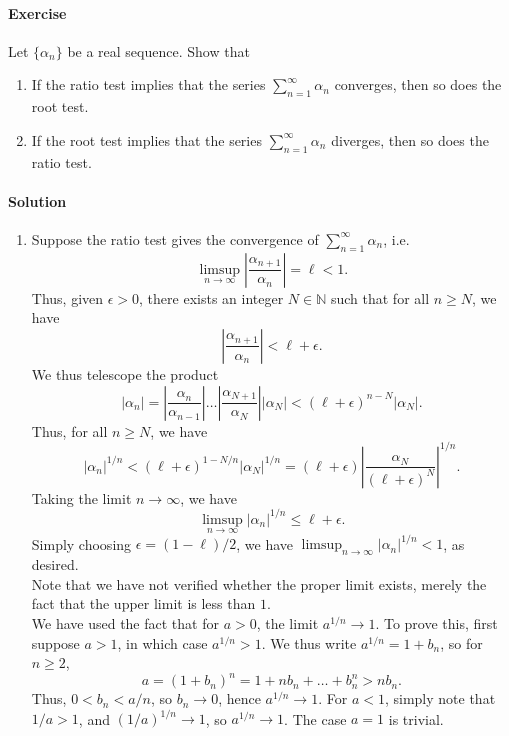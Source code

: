 \documentclass[10pt]{article}
\newcounter{prob}
\def\problem{\stepcounter{prob}\paragraph{Exercise \arabic{prob}}}
\def\solution{\paragraph{Solution}}
\begin{document}
        \problem Let $\{\alpha_n\}$ be a real sequence. Show that
        \begin{enumerate}
                \item If the ratio test implies that the series $\sum_{n = 1}^\infty \alpha_n$ converges, then so does the root test.
                \item If the root test implies that the series $\sum_{n = 1}^\infty \alpha_n$ diverges, then so does the ratio test.
        \end{enumerate}

        \solution
        \begin{enumerate}
                \item Suppose the ratio test gives the convergence of $\sum_{n = 1}^\infty \alpha_n$, i.e.\ 
                \[
                        \limsup_{n \to \infty} \left|\frac{\alpha_{n + 1}}{\alpha_n}\right| = \ell < 1.
                \]
                Thus, given $\epsilon > 0$, there exists an integer $N \in \mathbb{N}$ such that for all $n \geq N$, we have 
                \[
                        \left|\frac{\alpha_{n + 1}}{\alpha_n}\right| < \ell + \epsilon.
                \]
                We thus telescope the product
                \[
                        |\alpha_n| = \left| \frac{\alpha_{n}}{\alpha_{n - 1}} \right|\dots \left| \frac{\alpha_{N + 1}}{\alpha_{N}} \right| |\alpha_N|
                                < (\ell + \epsilon)^{n - N} |\alpha_N|.
                \]
                Thus, for all $n \geq N$, we have
                \[
                        |\alpha_n|^{1 /n} < (\ell + \epsilon)^{1 - N /n}|\alpha_N|^{1 /n}
                                = (\ell + \epsilon) \left|\frac{\alpha_N}{(\ell + \epsilon)^N}\right|^{1 /n}.
                \]
                Taking the limit $n \to \infty$, we have
                \[
                        \limsup_{n \to \infty} |\alpha_n|^{1 /n} \leq \ell + \epsilon.
                \]
                Simply choosing $\epsilon = (1 - \ell)/2$, we have $\limsup_{n \to \infty} |\alpha_n|^{1 /n} < 1$, as desired. \\

                Note that we have not verified whether the proper limit exists, merely the fact that the upper limit is less than $1$. \\

                We have used the fact that for $a > 0$, the limit $a^{1 /n} \to 1$. To prove this, first suppose $a > 1$, in which case
                $a^{1 /n} > 1$. We thus write $a^{1 /n} = 1 + b_n$, so for $n \geq 2$,
                \[
                        a = (1 + b_n)^n = 1 + nb_n + \dots + b_n^n > nb_n.
                \]
                Thus, $0 < b_n < a /n$, so $b_n \to 0$, hence $a^{1 /n} \to 1$. For $a < 1$, simply note that $1 /a > 1$, 
                and $(1 /a)^{1 /n} \to 1$, so $a^{1 /n} \to 1$. The case $a = 1$ is trivial.


\end{enumerate}
\end{document}

